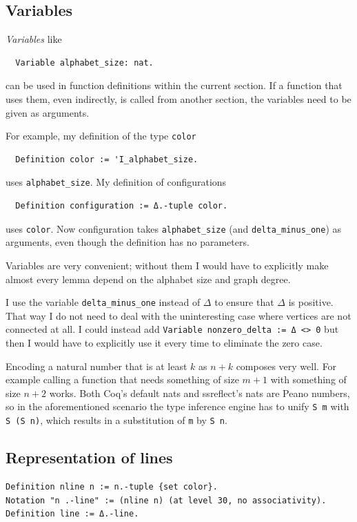 \documentclass[english, 12pt, a4paper, sci, a-1b, online]{aaltothesis}
\newcommand\icoq[1]{\texttt{#1}}
\begin{document}
\subsection{Variables}

\emph{Variables} like
\begin{verbatim}
  Variable alphabet_size: nat.
\end{verbatim}
can be used in function definitions within the current section. If a function that uses them, even indirectly, is called from another section, the variables need to be given as arguments.

For example, my definition of the type \icoq{color}
\begin{verbatim}
  Definition color := 'I_alphabet_size.
\end{verbatim}
uses \icoq{alphabet_size}. My definition of configurations
\begin{verbatim}
  Definition configuration := Δ.-tuple color.
\end{verbatim}
uses \icoq{color}. Now configuration takes \icoq{alphabet_size} (and \icoq{delta_minus_one}) as arguments, even though the definition has no parameters.

Variables are very convenient; without them I would have to explicitly make almost every lemma depend on the alphabet size and graph degree.

I use the variable \icoq{delta_minus_one} instead of $\Delta$ to ensure that $\Delta$ is positive. That way I do not need to deal with the uninteresting case where vertices are not connected at all. I could instead add \icoq{Variable nonzero_delta := Δ <> 0} but then I would have to explicitly use it every time to eliminate the zero case.

Encoding a natural number that is at least $k$ as $n + k$ composes very well. For example calling a function that needs something of size $m + 1$ with something of size $n + 2$ works. Both Coq's default nats and ssreflect's nats are Peano numbers, so in the aforementioned scenario the type inference engine has to unify \icoq{S m} with \icoq{S (S n)}, which results in a substitution of \icoq{m} by \icoq{S n}.

\subsection{Representation of lines}

\begin{verbatim}
Definition nline n := n.-tuple {set color}.
Notation "n .-line" := (nline n) (at level 30, no associativity).
Definition line := Δ.-line.
\end{verbatim}
\end{document}
